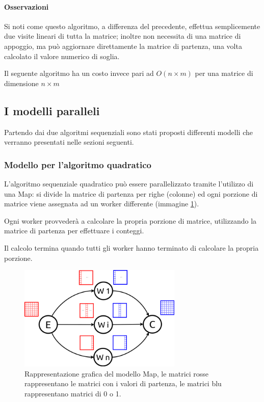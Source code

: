 \documentclass[a4paper,10pt]{article}
\begin{document}
\paragraph{Osservazioni}

Si noti come questo algoritmo, a differenza del precedente, effettua semplicemente due visite lineari di tutta la matrice; inoltre non necessita di una matrice di appoggio, ma pu\`o aggiornare direttamente la matrice di partenza, una volta calcolato il valore numerico di soglia.

Il seguente algoritmo ha un costo invece pari ad $O(n \times m)$ per una matrice di dimensione $n \times m$

\subsection{I modelli paralleli}

Partendo dai due algoritmi sequenziali sono stati proposti differenti modelli che verranno presentati nelle sezioni seguenti.

\subsubsection{Modello per l'algoritmo quadratico}

L'algoritmo sequenziale quadratico pu\`o essere parallelizzato tramite l'utilizzo di una \textsf{Map}: si divide la matrice di partenza per righe (colonne) ed ogni porzione di matrice viene assegnata ad un worker differente (immagine \ref{img:map}).

Ogni worker provveder\`a a calcolare la propria porzione di matrice, utilizzando la matrice di partenza per effettuare i conteggi.

Il calcolo termina quando tutti gli worker hanno terminato di calcolare la propria porzione.

\begin{figure}[ht]
\centering
\includegraphics[height=5cm]{map.png}
\caption{Rappresentazione grafica del modello \textsf{Map}, le matrici rosse rappresentano le matrici con i valori di partenza, le matrici blu rappresentano matrici di 0 o 1.}
\label{img:map}
\end{figure}
\end{document}
